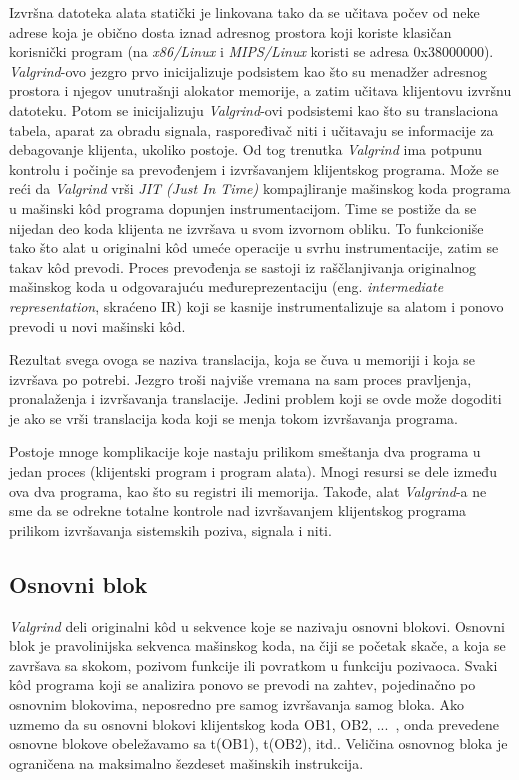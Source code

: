 \documentclass[12pt,oneside]{memoir}
\theoremstyle{plain}
\theoremstyle{definition}
\begin{document}
Izvršna datoteka alata statički je linkovana tako da se učitava počev od neke adrese koja je obično dosta iznad adresnog prostora koji koriste klasičan korisnički program (na \textit{x86/Linux} i \textit{MIPS/Linux} koristi se adresa 0x38000000). \textit{Valgrind}-ovo jezgro prvo inicijalizuje podsistem kao što su menadžer adresnog prostora i njegov unutrašnji alokator memorije, a zatim učitava klijentovu izvršnu datoteku. Potom se inicijalizuju \textit{Valgrind}-ovi podsistemi kao što su translaciona tabela, aparat za obradu signala, raspoređivač niti i učitavaju se informacije za debagovanje klijenta, ukoliko postoje. Od tog trenutka \textit{Valgrind} ima potpunu kontrolu i počinje sa prevođenjem i izvršavanjem klijentskog programa. Može se reći da \textit{Valgrind} vrši \textit{JIT (Just In Time)} kompajliranje mašinskog koda programa u mašinski k\^od programa dopunjen instrumentacijom. Time se postiže da se nijedan deo koda klijenta ne izvršava u svom izvornom obliku. To funkcioniše tako što alat u originalni k\^od umeće operacije u svrhu instrumentacije, zatim se takav k\^od prevodi. Proces prevođenja se sastoji iz raščlanjivanja originalnog mašinskog koda u odgovarajuću međureprezentaciju (eng. \textit{intermediate representation}, skraćeno IR) koji se kasnije instrumentalizuje sa alatom i ponovo prevodi u novi mašinski k\^od.

Rezultat svega ovoga se naziva translacija, koja se čuva u memoriji i koja se izvršava po potrebi. Jezgro troši najviše vremana na sam proces pravljenja,  pronalaženja i izvršavanja translacije. Jedini problem koji se ovde može dogoditi je ako se vrši translacija koda koji se menja tokom izvršavanja programa.

Postoje mnoge komplikacije koje nastaju prilikom smeštanja dva programa u jedan proces (klijentski program i program alata). Mnogi resursi se dele između ova dva programa, kao što su registri ili memorija. Takođe, alat \textit{Valgrind}-a ne sme da se odrekne totalne kontrole nad izvršavanjem klijentskog programa prilikom izvršavanja sistemskih poziva, signala i niti.

\subsection*{Osnovni blok}
\textit{Valgrind} deli originalni k\^od u sekvence koje se nazivaju osnovni blokovi. Osnovni blok je pravolinijska sekvenca mašinskog koda, na čiji se početak skače, a koja se završava sa skokom, pozivom funkcije ili povratkom u funkciju pozivaoca. Svaki k\^od programa koji se analizira ponovo se prevodi na zahtev, pojedinačno po osnovnim blokovima, neposredno pre samog izvršavanja samog bloka. Ako uzmemo da su osnovni blokovi klijentskog koda OB1, OB2, ...~, onda prevedene osnovne blokove obeležavamo sa t(OB1), t(OB2), itd.. Veličina osnovnog bloka je ograničena na maksimalno šezdeset mašinskih instrukcija.
\end{document}
